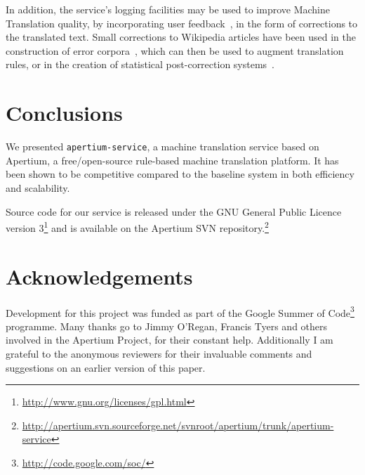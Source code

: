 \documentclass[11pt]{article}
\begin{document}
In addition, the service's logging facilities may be used to improve Machine Translation quality, by incorporating user feedback~\citep{google}, in the form of corrections to the translated text. Small corrections to Wikipedia articles have been used in the construction of error corpora~\citep{milek08}, which can then be used to augment translation rules, or in the creation of statistical post-correction systems~\citep{dugast07}.


\section{Conclusions}

We presented {\tt\small apertium-service}, a machine translation service based on Apertium, a free/open-source rule-based machine translation platform. It has been shown to be competitive compared to the baseline system in both efficiency and scalability.

Source code for our service is released under the GNU General Public Licence version 3\footnote{\small\url{http://www.gnu.org/licenses/gpl.html}} and is available on the Apertium SVN repository.\footnote{{\small\url{http://apertium.svn.sourceforge.net/svnroot/apertium/trunk/apertium-service}}}

\section*{Acknowledgements}

Development for this project was funded as part of the Google Summer of Code\footnote{\url{http://code.google.com/soc/}} programme.
Many thanks go to Jimmy O'Regan, Francis Tyers and others involved in the Apertium Project, for their constant help. Additionally I am grateful to the anonymous reviewers for their invaluable comments and suggestions on an earlier version of this paper.



\end{document}
